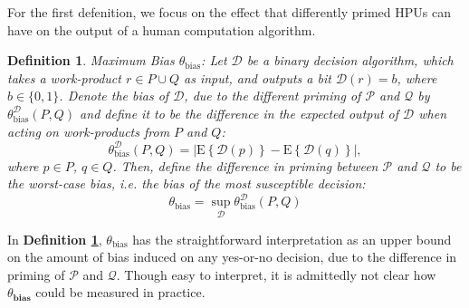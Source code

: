 \documentclass[12pt]{article}
\newtheorem{mydef}{Definition}
\begin{document}
For the first defenition, we focus on the effect that differently primed
HPUs can have on the output of a human computation algorithm.

\begin{mydef}
	\label{def:bias}
	{\upshape Maximum Bias $\theta_\mathrm{bias}$:}
	Let $\mathcal{D}$ be a binary decision algorithm, which takes a 
	work-product
	$r \in P \cup Q$ as input, and outputs a bit $\mathcal{D}(r)=b$, where 
	$b \in \{0,1\}$. Denote the \emph{bias} of $\mathcal{D}$, due to the
	different priming of $\mathcal{P}$ and $\mathcal{Q}$ by
	$\theta^\mathcal{D}_\mathrm{bias}(P,Q)$ and define it to be the difference 
	in the expected output of $\mathcal{D}$ when acting on work-products from 
	$P$ and $Q$:
	$$
	\theta^\mathcal{D}_\mathrm{bias}(P,Q) = 
		\left| 
			\mathrm{E}\left\{ \mathcal{D}(p) \right\} 
			- \mathrm{E}\left\{ \mathcal{D}(q) \right\} 
		\right|,
	$$
	where $p \in P$, $q \in Q$.  Then, define the difference in priming 
	between $\mathcal{P}$ and $\mathcal{Q}$ to be the worst-case bias, i.e. 
	the bias of the most susceptible decision:
	$$
	\theta_\mathrm{bias} = 
		\sup_\mathcal{D} \theta^\mathcal{D}_\mathrm{bias}(P,Q)
	$$
\end{mydef}
In \textbf{Definition \ref{def:bias}}, $\theta_\mathrm{bias}$ has the 
straightforward interpretation as an upper bound on the amount of bias induced 
on any yes-or-no decision, due to the difference in priming of 
$\mathcal{P}$ and $\mathcal{Q}$.  Though easy to interpret, it is admittedly
not clear how $\theta_\mathbf{bias}$ could be measured in practice.
\end{document}
